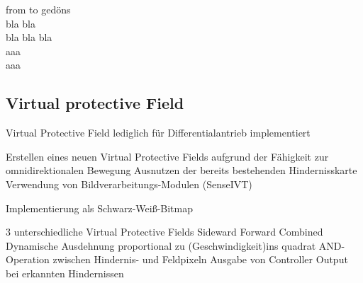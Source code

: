 
\begin{description}
\item[from to gedöns]
\item[bla bla]
\item[bla bla bla]
\item[aaa]
\item[aaa]
\end{description}



\subsection{Virtual protective Field}
 
 Virtual Protective Field lediglich für Differentialantrieb implementiert
 
    Erstellen eines neuen Virtual Protective Fields aufgrund der Fähigkeit zur omnidirektionalen Bewegung
        Ausnutzen der bereits bestehenden Hindernisskarte
            Verwendung von Bildverarbeitungs-Modulen (SenseIVT)

Implementierung als Schwarz-Weiß-Bitmap

        3 unterschiedliche Virtual Protective Fields
            Sideward
            Forward
            Combined
        Dynamische Ausdehnung proportional zu (Geschwindigkeit)ins quadrat
        AND-Operation zwischen Hindernis- und Feldpixeln
        Ausgabe von Controller Output bei erkannten Hindernissen
